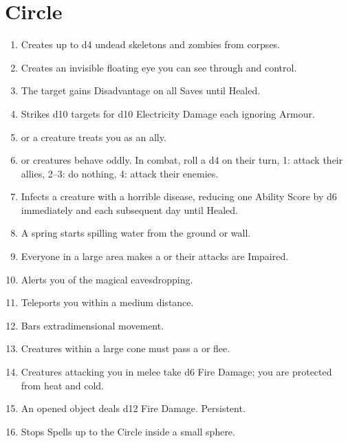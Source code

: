 \documentclass[itdr]{subfiles}
\begin{document}

\vfill
\break

\section{ Circle}
\def \spellcircle {4}
\begin{enumerate}
	\item {} Creates up to d4 undead skeletons and zombies from corpses.
	\item {} Creates an invisible floating eye you can see through and control.
	\item {} The target gains Disadvantage on all Saves until Healed.
	\item {} Strikes d10 targets for d10 Electricity Damage each ignoring Armour.
	\item {}  or a creature treats you as an ally.
	\item {}  or creatures behave oddly. In combat, roll a d4 on their turn, 1: attack their allies, 2--3: do nothing, 4: attack their enemies.
	\item {} Infects a creature with a \mbox{horrible} disease, reducing one Ability Score by d6 immediately and each subsequent day until Healed.
	\item {} A spring starts spilling water from the ground or wall.
	\item {} Everyone in a large area makes a  or their attacks are Impaired.
	\item {} Alerts you of the magical eavesdropping.
	\item {} Teleports you within a medium distance.
	\item {} Bars extradimensional movement.
	\item {} Creatures within a large cone must pass a  or flee.
	\item {} Creatures attacking you in melee take d6 Fire Damage; you are protected from heat and cold.
	\item {} An opened object deals d12 Fire Damage. Persistent.
	\item {} Stops Spells up to the  Circle inside a small sphere.

\end{enumerate}
\end{document}
